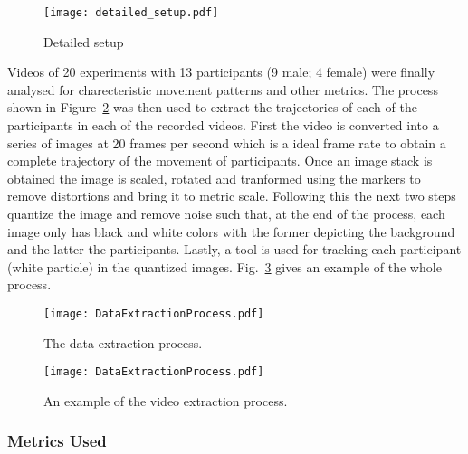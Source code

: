 \begin{figure}[!tbhp]
    \begin{center}
        \texttt{[image: detailed\_setup.pdf]}
    \end{center}
    \caption{Detailed setup}
    \label{fig:detailed_setup}
\end{figure}

Videos of 20 experiments with 13 participants (9 male; 4 female) were finally analysed for charecteristic movement patterns and other metrics. The process shown in Figure~\ref{fig:the_video_extraction_process} was then used to extract the trajectories of each of the participants in each of the recorded videos. First the video is converted into a series of images at 20 frames per second which is a ideal frame rate to obtain a complete trajectory of the movement of participants. Once an image stack is obtained the image is scaled, rotated and tranformed using the markers to remove distortions and bring it to metric scale. Following this the next two steps quantize the image and remove noise such that, at the end of the process, each image only has black and white colors with the former depicting the background and the latter the participants. Lastly, a tool is used for tracking each participant (white particle) in the quantized images. Fig.~\ref{fig:VideoExtractionExample} gives an example of the whole process.

\begin{figure}[!tbhp]
    \begin{center}
        \texttt{[image: DataExtractionProcess.pdf]}
    \end{center}
    \caption{The data extraction process.}
    \label{fig:the_video_extraction_process}
\end{figure}

\begin{figure}[!tbhp]
    \begin{center}
        \texttt{[image: DataExtractionProcess.pdf]}
    \end{center}
    \caption{An example of the video extraction process.}
    \label{fig:VideoExtractionExample}
\end{figure}



\subsubsection{Metrics Used} %
\label{sec:metrics_used}


